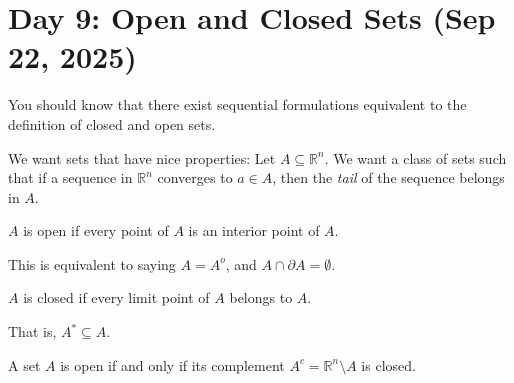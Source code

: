 \section{Day 9: Open and Closed Sets (Sep 22, 2025)}

You should know that there exist sequential formulations equivalent to the definition of closed and open sets.

We want sets that have nice properties: Let $A \subseteq \mathbb{R}^n$. We want a class of sets such that if a sequence in $\mathbb{R}^n$ converges to $a \in A$, then the \textit{tail} of the sequence belongs in $A$.

\begin{definition}
$A$ is open if every point of $A$ is an interior point of $A$.  
\end{definition}

This is equivalent to saying $A = A^o$, and $A \cap \partial A = \emptyset$.

\begin{definition}
$A$ is closed if every limit point of $A$ belongs to $A$. 
\end{definition}

That is, $A^* \subseteq A$.

\begin{theorem}
    A set $A$ is open if and only if its complement $A^c = \mathbb{R}^n \setminus A$ is closed.
\end{theorem}
